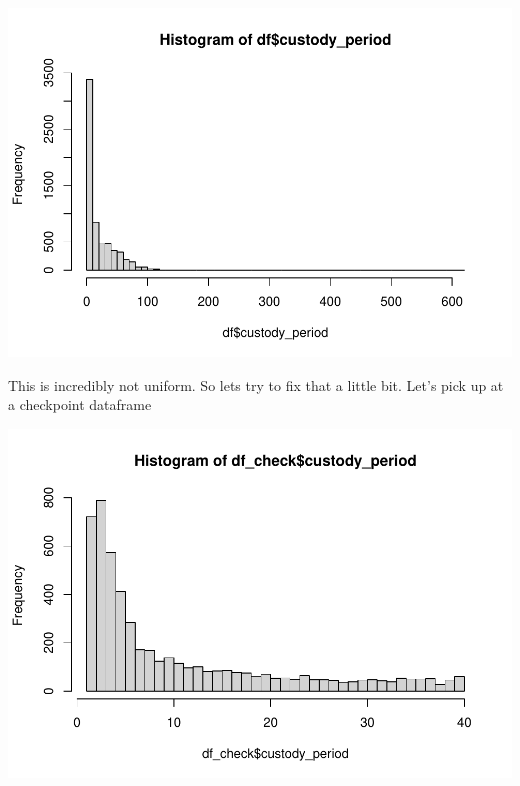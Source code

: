 \documentclass[
]{article}
\newenvironment{Shaded}{\begin{snugshade}}{\end{snugshade}}
\newcommand{\AttributeTok}[1]{\textcolor[rgb]{0.77,0.63,0.00}{#1}}
\newcommand{\DecValTok}[1]{\textcolor[rgb]{0.00,0.00,0.81}{#1}}
\newcommand{\FunctionTok}[1]{\textcolor[rgb]{0.00,0.00,0.00}{#1}}
\newcommand{\NormalTok}[1]{#1}
\newcommand{\OtherTok}[1]{\textcolor[rgb]{0.56,0.35,0.01}{#1}}
\newcommand{\SpecialCharTok}[1]{\textcolor[rgb]{0.00,0.00,0.00}{#1}}
\begin{document}
\includegraphics{neuralNet_files/figure-latex/unnamed-chunk-14-1}

This is incredibly not uniform. So lets try to fix that a little bit.
Let's pick up at a checkpoint dataframe

\begin{Shaded}
\end{Shaded}

\includegraphics{neuralNet_files/figure-latex/unnamed-chunk-15-1}
\end{document}
